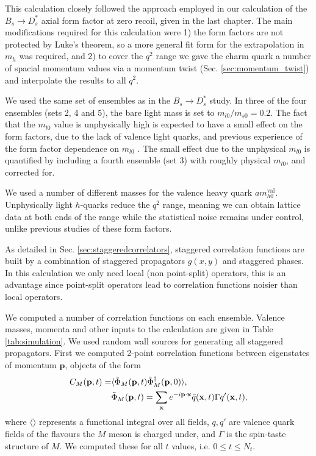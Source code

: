 This calculation closely followed the approach employed in our calculation of the $B_s\to D_s^*$ axial form factor at zero recoil, given in the last chapter. The main modifications required for this calculation were 1) the form factors are not protected by Luke's theorem, so a more general fit form for the extrapolation in $m_h$ was required, and 2) to cover the $q^2$ range we gave the charm quark a number of spacial momentum values via a momentum twist (Sec. \ref{sec:momentum_twist}) and interpolate the results to all $q^2$.

We used the same set of ensembles as in the $B_s\to D_s^*$ study. In three of the four ensembles (sets 2, 4 and 5), the bare light mass is set to $m_{l0}/m_{s0} = 0.2$. The fact that the $m_{l0}$ value is unphysically high is expected to have a small effect on the form factors, due to the lack of valence light quarks, and previous experience of the form factor dependence on $m_{l0}$ \cite{Monahan:2017uby}. The small effect due to the unphysical $m_{l0}$ is quantified by including a fourth ensemble (set 3) with roughly physical $m_{l0}$, and corrected for. 

We used a number of different masses for the valence heavy quark $am_{h0}^{\text{val}}$. Unphysically light $h$-quarks reduce the $q^2$ range, meaning we can obtain lattice data at both ends of the range while the statistical noise remains under control, unlike previous studies of these form factors.

As detailed in Sec. \ref{sec:staggeredcorrelators}, staggered correlation functions are built by a combination of staggered propagators $g(x,y)$ and staggered phases. In this calculation we only need local (non point-split) operators, this is an advantage since point-split operators lead to correlation functions noisier than local operators.

We computed a number of correlation functions on each ensemble. Valence masses, momenta and other inputs to the calculation are given in Table \ref{tab:simulation}. We used random wall sources for generating all staggered propagators. First we computed 2-point correlation functions between eigenstates of momentum ${\textbf{p}}$, objects of the form
\begin{align}
  C_{M}({\textbf{p}},t) =& \langle \tilde{\Phi}_M ({\bf{p}},t) \tilde{\Phi}_M^{\dagger}({\bf{p}},0) \rangle, \\ 
  &\tilde{\Phi}_M({\bf{p}},t) = \sum_{{\bf{x}}} e^{-i\bf{p}\cdot \bf{x}} \bar{q}({\bf{x}},t) \Gamma q'({\bf{x}},t), \nonumber
\end{align}
where $\langle \rangle$ represents a functional integral over all fields, $q,q'$ are valence quark fields of the flavours the $M$ meson is charged under, and $\Gamma$ is the spin-taste structure of $M$. We computed these for all $t$ values, i.e. $0\leq t \leq N_t$.

